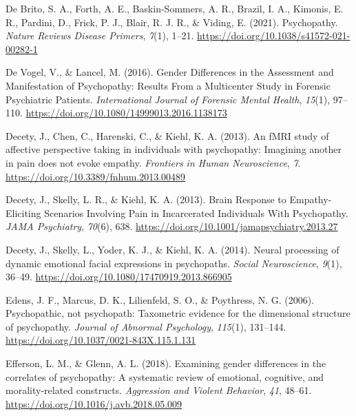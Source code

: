 \documentclass[
  man,floatsintext]{apa7}
\newlength{\cslhangindent}
\newlength{\cslentryspacingunit} %
\newenvironment{CSLReferences}[2] %
 {%
  \setlength{\parindent}{0pt}
  \ifodd #1
  \let\oldpar\par
  \def\par{\hangindent=\cslhangindent\oldpar}
  \fi
  \setlength{\parskip}{#2\cslentryspacingunit}
 }%
 {}
\begin{document}
\begin{CSLReferences}{1}{0}
\leavevmode{}%
De Brito, S. A., Forth, A. E., Baskin-Sommers, A. R., Brazil, I. A., Kimonis, E. R., Pardini, D., Frick, P. J., Blair, R. J. R., \& Viding, E. (2021). Psychopathy. \emph{Nature Reviews Disease Primers}, \emph{7}(1), 1--21. \url{https://doi.org/10.1038/s41572-021-00282-1}

\leavevmode{}%
De Vogel, V., \& Lancel, M. (2016). Gender {Differences} in the {Assessment} and {Manifestation} of {Psychopathy}: {Results From} a {Multicenter Study} in {Forensic Psychiatric Patients}. \emph{International Journal of Forensic Mental Health}, \emph{15}(1), 97--110. \url{https://doi.org/10.1080/14999013.2016.1138173}

\leavevmode{}%
Decety, J., Chen, C., Harenski, C., \& Kiehl, K. A. (2013). An {fMRI} study of affective perspective taking in individuals with psychopathy: Imagining another in pain does not evoke empathy. \emph{Frontiers in Human Neuroscience}, \emph{7}. \url{https://doi.org/10.3389/fnhum.2013.00489}

\leavevmode{}%
Decety, J., Skelly, L. R., \& Kiehl, K. A. (2013). Brain {Response} to {Empathy-Eliciting Scenarios Involving Pain} in {Incarcerated Individuals With Psychopathy}. \emph{JAMA Psychiatry}, \emph{70}(6), 638. \url{https://doi.org/10.1001/jamapsychiatry.2013.27}

\leavevmode{}%
Decety, J., Skelly, L., Yoder, K. J., \& Kiehl, K. A. (2014). Neural processing of dynamic emotional facial expressions in psychopaths. \emph{Social Neuroscience}, \emph{9}(1), 36--49. \url{https://doi.org/10.1080/17470919.2013.866905}

\leavevmode{}%
Edens, J. F., Marcus, D. K., Lilienfeld, S. O., \& Poythress, N. G. (2006). Psychopathic, not psychopath: {Taxometric} evidence for the dimensional structure of psychopathy. \emph{Journal of Abnormal Psychology}, \emph{115}(1), 131--144. \url{https://doi.org/10.1037/0021-843X.115.1.131}

\leavevmode{}%
Efferson, L. M., \& Glenn, A. L. (2018). Examining gender differences in the correlates of psychopathy: {A} systematic review of emotional, cognitive, and morality-related constructs. \emph{Aggression and Violent Behavior}, \emph{41}, 48--61. \url{https://doi.org/10.1016/j.avb.2018.05.009}


\end{CSLReferences}
\end{document}
